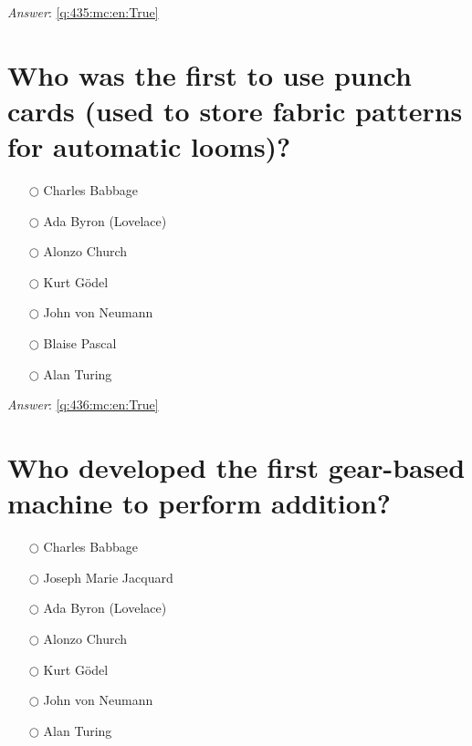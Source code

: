 \documentclass[a4paper,11pt,oneside]{book}
\begin{document}
\begin{sloppypar}
\vspace{1cm}

\textit{Answer}: \autoref{q:435:mc:en:True}



\section{Who was the first to use punch cards (used to store fabric patterns for automatic looms)?}

\label{q:436:mc:en:False}

\begin{itemize}
  \item[$\bigcirc$] Charles Babbage
  \item[$\bigcirc$] Ada Byron (Lovelace)
  \item[$\bigcirc$] Alonzo Church
  \item[$\bigcirc$] Kurt G\"odel
  \item[$\bigcirc$] John von Neumann
  \item[$\bigcirc$] Blaise Pascal
  \item[$\bigcirc$] Alan Turing
\end{itemize}

\vspace{1cm}

\textit{Answer}: \autoref{q:436:mc:en:True}



\section{Who developed the first gear-based machine to perform addition?}

\label{q:437:mc:en:False}

\begin{itemize}
  \item[$\bigcirc$] Charles Babbage
  \item[$\bigcirc$] Joseph Marie Jacquard
  \item[$\bigcirc$] Ada Byron (Lovelace)
  \item[$\bigcirc$] Alonzo Church
  \item[$\bigcirc$] Kurt G\"odel
  \item[$\bigcirc$] John von Neumann
  \item[$\bigcirc$] Alan Turing
\end{itemize}

\vspace{1cm}


\end{sloppypar}
\end{document}
